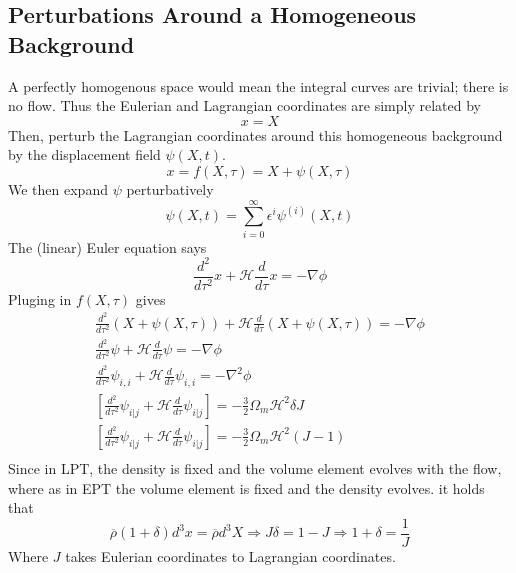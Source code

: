 \subsection{Perturbations Around a Homogeneous Background}
A perfectly homogenous space would mean the integral curves are trivial; there is no flow. Thus the Eulerian and Lagrangian coordinates are simply related by
\begin{equation}
	x = X
\end{equation}
Then, perturb the Lagrangian coordinates around this homogeneous background by the displacement field $\psi(X,t)$.
\begin{equation}
	x = f(X,\tau) = X + \psi(X,\tau)
\end{equation}
We then expand $\psi$ perturbatively
\begin{equation}
	\psi(X,t) = \sum_{{i=0}}^\infty \epsilon^i \psi^{(i)}(X,t)
\end{equation}
The (linear) Euler equation says
\begin{equation}
	\frac{d^2}{d\tau^2}x + \mathcal{H}\frac{d}{d\tau}x = -\nabla\phi
\end{equation}
Pluging in $f(X,\tau)$ gives
\begin{equation} %
	\begin{split}
		\frac{d^2}{d\tau^2}(X+\psi(X,\tau)) + \mathcal{H}\frac{d}{d\tau}(X+\psi(X,\tau)) = -\nabla\phi \\
		\frac{d^2}{d\tau^2}\psi + \mathcal{H}\frac{d}{d\tau}\psi = -\nabla\phi \\
		\frac{d^2}{d\tau^2}\psi_{i,i} + \mathcal{H}\frac{d}{d\tau}\psi_{i,i} = -\nabla^2\phi \\
		\left[\frac{d^2}{d\tau^2}\psi_{i|j} + \mathcal{H}\frac{d}{d\tau}\psi_{i|j}\right] = -\frac{3}{2}\Omega_m\mathcal{H}^2 \delta J \\
		\left[\frac{d^2}{d\tau^2}\psi_{i|j} + \mathcal{H}\frac{d}{d\tau}\psi_{i|j}\right] = -\frac{3}{2}\Omega_m\mathcal{H}^2 (J-1)\\
	\end{split}
\end{equation}
Since in LPT, the density is fixed and the volume element evolves with the flow, where as in EPT the volume element is fixed and the density evolves. it holds that
\begin{equation}
	\overline{\rho}(1+\delta)d^3x = \overline{\rho}d^3X \Rightarrow J\delta = 1-J \Rightarrow 1+\delta = \frac{1}{J}
\end{equation}
Where $J$ takes Eulerian coordinates to Lagrangian coordinates.

